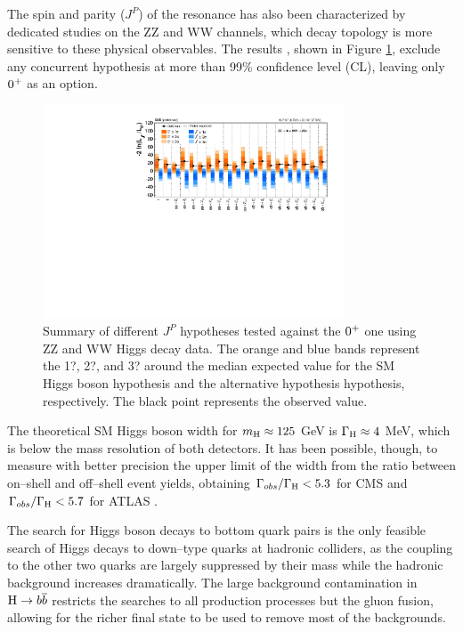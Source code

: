 The spin and parity ($J^P$) of the resonance has also been characterized by dedicated studies on the ZZ and WW channels, which decay topology is more sensitive to these physical observables. The results \cite{CMS:2014gga}, shown in Figure \ref{fig:hjp}, exclude any concurrent hypothesis at more than 99\% confidence level (CL), leaving only $0^{+}$ as an option.

\begin{figure}
        \centering
	\includegraphics[width=0.8\textwidth]{1_Introduction_Th_and_Exp/pics/hwwhzz_JP_SummaryPlot.pdf}
       \caption{Summary of different $J^P$ hypotheses tested against the $0^{+}$ one using ZZ and WW Higgs decay data. The orange and blue bands represent the 1?, 2?, and 3? around the median expected value for the SM Higgs boson hypothesis and the alternative hypothesis hypothesis, respectively. The black point represents the observed value. }
       \label{fig:hjp}
\end{figure}

The theoretical SM Higgs boson width for $m_{\mathrm{H}} \approx 125$ GeV is $\Gamma_{\mathrm{H}} \approx 4$ MeV, which is below the mass resolution of both detectors. It has been possible, though, to measure with better precision the upper limit of the width from the ratio between on--shell and off--shell event yields, obtaining $\Gamma_{obs} / \Gamma_{\mathrm{H}} < 5.3$ for CMS \cite{Khachatryan:2014iha} and $\Gamma_{obs} / \Gamma_{\mathrm{H}} < 5.7$ for ATLAS \cite{ATLASCONF:2014042}. 

The search for Higgs boson decays to bottom quark pairs is the only feasible search of Higgs decays to down--type quarks at hadronic colliders, as the coupling to the other two quarks are largely suppressed by their mass while the hadronic background increases dramatically. The large background contamination in $\mathrm{H}\rightarrow b\overline{b}$ restricts the searches to all production processes but the gluon fusion, allowing for the richer final state to be used to remove most of the backgrounds.

